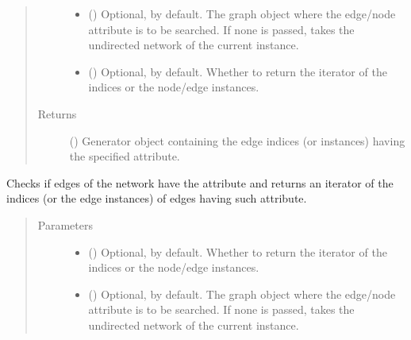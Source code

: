 \documentclass[letterpaper,10pt,english]{sphinxmanual}
\begin{document}
\begin{fulllineitems}
\begin{fulllineitems}
\begin{quote}
\begin{description}
\begin{itemize}
\item {} 
 () \textendash{} Optional,  by default. The graph object where the
edge/node attribute is to be searched. If none is passed,
takes the undirected network of the current instance.

\item {} 
 () \textendash{} Optional,  by default. Whether to return the
iterator of the indices or the node/edge instances.

\end{itemize}

\item[{Returns}] \leavevmode
() \textendash{} Generator object containing the edge
indices (or instances) having the specified attribute.

\end{description}\end{quote}

\end{fulllineitems}


\begin{fulllineitems}
\label{\detokenize{main:pypath.main.PyPath.having_ptm}}
Checks if edges of the network have the  attribute and
returns an iterator of the indices (or the edge instances) of
edges having such attribute.
\begin{quote}\begin{description}
\item[{Parameters}] \leavevmode\begin{itemize}
\item {} 
 () \textendash{} Optional,  by default. Whether to return the
iterator of the indices or the node/edge instances.

\item {} 
 () \textendash{} Optional,  by default. The graph object where the
edge/node attribute is to be searched. If none is passed,
takes the undirected network of the current instance.


\end{itemize}
\end{description}
\end{quote}
\end{fulllineitems}
\end{fulllineitems}
\end{document}
